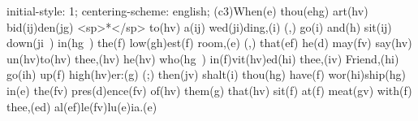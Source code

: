 initial-style: 1;
centering-scheme: english;
(c3)When(e) thou(ehg) art(hv) bid(ij)den(jg) <sp>*</sp> to(hv) a(ij) wed(ji)ding,(i) (,) go(i) and(h) sit(ij) down(ji~) in(hg~) the(f) low(gh)est(f) room,(e) (,) that(ef) he(d) may(fv) say(hv) un(hv)to(hv) thee,(hv) he(hv) who(hg~) in(f)vit(hv)ed(hi) thee,(iv) Friend,(hi) go(ih) up(f) high(hv)er:(g) (;) then(jv) shalt(i) thou(hg) have(f) wor(hi)ship(hg) in(e) the(fv) pres(d)ence(fv) of(hv) them(g) that(hv) sit(f) at(f) meat(gv) with(f) thee,(ed) al(ef)le(fv)lu(e)ia.(e)

